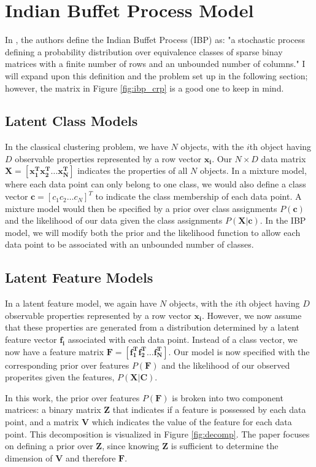 \documentclass[twoside]{article}
\begin{document}
\section{Indian Buffet Process Model}
In \citet{Griffiths2011}, the authors define the Indian Buffet Process (IBP) as: "a stochastic process defining a probability distribution over equivalence classes of sparse binay matrices with a finite number of rows and an unbounded number of columns." I will expand upon this definition and the problem set up in the following section; however, the matrix in Figure \ref{fig:ibp_crp} is a good one to keep in mind.

\subsection{Latent Class Models}
In the classical clustering problem, we have $N$ objects, with the $i$th object having $D$ observable properties represented by a row vector $\mathbf{x_i}$. Our $N \times D$ data matrix $\mathbf{X} = [\mathbf{x_1^T x_2^T \dots x_N^T}]$ indicates the properties of all $N$ objects. In a mixture model, where each data point can only belong to one class, we would also define a class vector $\mathbf{c} = [c_1 c_2 \dots c_N]^T$ to indicate the class membership of each data point. A mixture model would then be specified by a prior over class assignments $P(\mathbf{c})$ and the likelihood of our data given the class assignments $P(\mathbf{X | c})$. In the IBP model, we will modify both the prior and the likelihood function to allow each data point to be associated with an unbounded number of classes.

\subsection{Latent Feature Models}
In a latent feature model, we again have $N$ objects, with the $i$th object having $D$ observable properties represented by a row vector $\mathbf{x_i}$. However, we now assume that these properties are generated from a distribution determined by a latent feature vector $\mathbf{f_i}$ associated with each data point. Instead of a class vector, we now have a feature matrix $\mathbf{F} = [\mathbf{f_1^T f_2^T \dots f_N^T}]$. Our model is now specified with the corresponding prior over features $P(\mathbf{F})$ and the likelihood of our observed properites given the features, $P(\mathbf{X | C})$.

In this work, the prior over features $P(\mathbf{F})$ is broken into two component matrices: a binary matrix $\mathbf{Z}$ that indicates if a feature is possessed by each data point, and a matrix $\mathbf{V}$ which indicates the value of the feature for each data point. This decomposition is visualized in Figure \ref{fig:decomp}. The paper focuses on defining a prior over $\mathbf{Z}$, since knowing $\mathbf{Z}$ is sufficient to determine the dimension of $\mathbf{V}$ and therefore $\mathbf{F}$.
\end{document}
